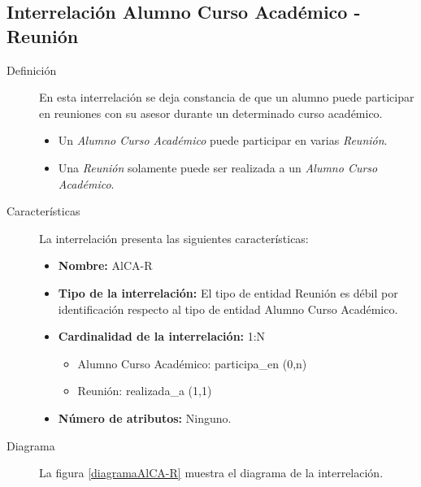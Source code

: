 \subsection{Interrelación Alumno Curso Académico - Reunión}

   \begin{description}
      \item[Definición] En esta interrelación se deja constancia de que un
      alumno puede participar en reuniones con su asesor durante un determinado
      curso académico.

      \begin{itemize}
       \item Un \textit{Alumno Curso Académico} puede participar en varias
             \textit{Reunión}.
       \item Una \textit{Reunión} solamente puede ser realizada a un
             \textit{Alumno Curso Académico}.
      \end{itemize}

      \item[Características] La interrelación presenta las siguientes
                             características:

         \begin{itemize}
            \item \textbf{Nombre:} AlCA-R
            \item \textbf{Tipo de la interrelación:} El tipo de entidad Reunión
                  es débil por identificación respecto al tipo de entidad Alumno
                  Curso Académico.
            \item \textbf{Cardinalidad de la interrelación:} 1:N
                  \begin{itemize}
                     \item Alumno Curso Académico: participa\_en (0,n)
                     \item Reunión: realizada\_a (1,1)
                  \end{itemize}
            \item \textbf{Número de atributos:} Ninguno.
         \end{itemize}

      \item[Diagrama] La figura \ref{diagramaAlCA-R} muestra el diagrama de la
                      interrelación.


\end{description}
